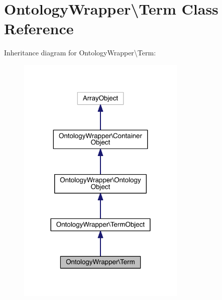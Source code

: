 \hypertarget{class_ontology_wrapper_1_1_term}{\section{Ontology\-Wrapper\textbackslash{}Term Class Reference}
\label{class_ontology_wrapper_1_1_term}
}


Inheritance diagram for Ontology\-Wrapper\textbackslash{}Term\-:
\nopagebreak
\begin{figure}[H]
\begin{center}
\leavevmode
\includegraphics[width=228pt]{class_ontology_wrapper_1_1_term__inherit__graph}
\end{center}
\end{figure}


